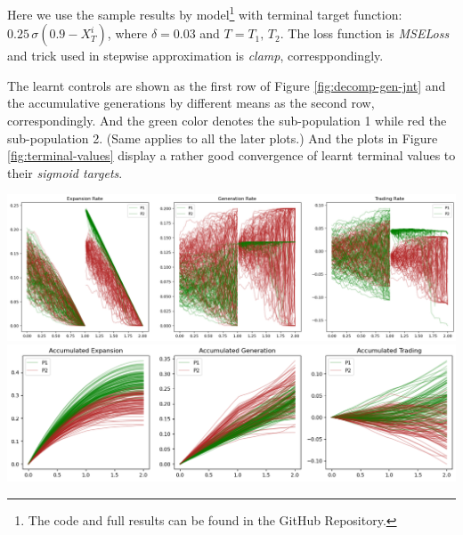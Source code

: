 \documentclass[a4paper,10pt]{article}
\newcommand{\1}{\mathbf{1}}
\begin{document}
Here we use the sample results by model\footnote{The code and full results can be found in the {GitHub Repository}.} with terminal target function: $0.25\,\sigma{\left(0.9-X_T^i\right)}$, where $\delta=0.03$ and $T=T_1,\,T_2$. The loss function is \textit{MSELoss} and trick used in stepwise approximation is \textit{clamp}, corresppondingly. 

The learnt controls are shown as the first row of Figure \ref{fig:decomp-gen-jnt} and the accumulative generations by different means as the second row, correspondingly. And the green color denotes the sub-population 1 while red the sub-population 2. (Same applies to all the later plots.) 
And the plots in Figure \ref{fig:terminal-values} display a rather good convergence of learnt terminal values to their \textit{sigmoid targets}. 

\begin{minipage}[h]{\textwidth}
  \centering
  \begin{minipage}[h]{0.75\textwidth} 
    \centering
    \includegraphics{FinalReports/Illustration_diagrams/Seprt-2A2P-Sigmoid-ResExamples/Rates.png}\\
    \includegraphics{FinalReports/Illustration_diagrams/Joint-2A2P-Sigmoid-ResExamples/AccumRates.png}\\
    \label{fig:decomp-gen-jnt}
  \end{minipage}


\end{minipage}
\end{document}
